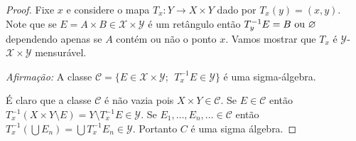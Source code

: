 \begin{proof}
Fixe $x$ e considere o mapa $T_x:Y\to X\times Y$ dado por $T_x(y)=(x,y)$.
 Note que se $E=A\times B\in \mathscr{X}\times \mathscr{Y}$
é um retângulo então $T_{y}^{-1}E=B~\textnormal{ou}~\varnothing$ dependendo apenas se 
$A$ contém ou não o ponto $x$. Vamos mostrar que $T_x$ é $\mathscr{Y}$-$\mathscr{X}\times \mathscr{Y}$ 
mensurável. 
\medskip

\noindent \emph{Afirmação:}  A classe
 $\mathcal{C}=\{E\in \mathscr{X}\times \mathscr{Y};~~T_x^{-1}E\in \mathscr{Y} \}$ é uma sigma-álgebra.
\medskip 
 
\noindent É claro que a classe  $\mathcal{C}$ é não vazia pois $X\times Y\in \mathcal{C}$. 
 Se $E\in \mathcal{C}$ então 
$T_x^{-1}(X\times Y\setminus E)=Y\setminus T_x^{-1}E\in \mathscr{Y}.$  
Se $E_1, \ldots, E_n, \ldots \in \mathcal{C}$ então $T_x^{-1}(\bigcup E_n)=\bigcup T_x^{-1}E_n\in \mathscr{Y}$. Portanto 
$C$ é uma sigma álgebra.

\end{proof}